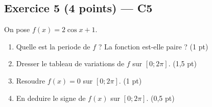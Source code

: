 \subsection*{Exercice 5 \hfill (4 points) — C5}

On pose $f(x) = 2\cos x + 1$.

\begin{enumerate}
  \item Quelle est la periode de $f$ ? La fonction est-elle paire ? \hfill (1 pt)
  \item Dresser le tableau de variations de $f$ sur $[0;2\pi]$. \hfill (1,5 pt)
  \item Resoudre $f(x) = 0$ sur $[0;2\pi]$. \hfill (1 pt)
  \item En deduire le signe de $f(x)$ sur $[0;2\pi]$. \hfill (0,5 pt)
\end{enumerate}
